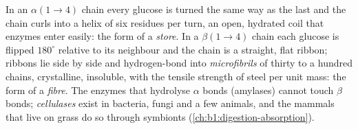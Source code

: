 \begin{proposition}\label{prop:b1:carbohydrates:alphabeta}
In an $\alpha(1{\to}4)$ chain every glucose is turned the same way as
the last and the chain curls into a helix of six residues per turn, an
open, hydrated coil that enzymes enter easily: the form of a
\emph{store}. In a $\beta(1{\to}4)$ chain each glucose is flipped
$180^\circ$ relative to its neighbour and the chain is a straight,
flat ribbon; ribbons lie side by side and hydrogen-bond into
\emph{microfibrils} of thirty to a hundred chains, crystalline,
insoluble, with the tensile strength of steel per unit mass: the form
of a \emph{fibre}. The enzymes that hydrolyse $\alpha$ bonds (amylases)
cannot touch $\beta$ bonds; \emph{cellulases} exist in bacteria, fungi
and a few animals, and the mammals that live on grass do so through
symbionts (\cref{ch:b1:digestion-absorption}).
\end{proposition}

